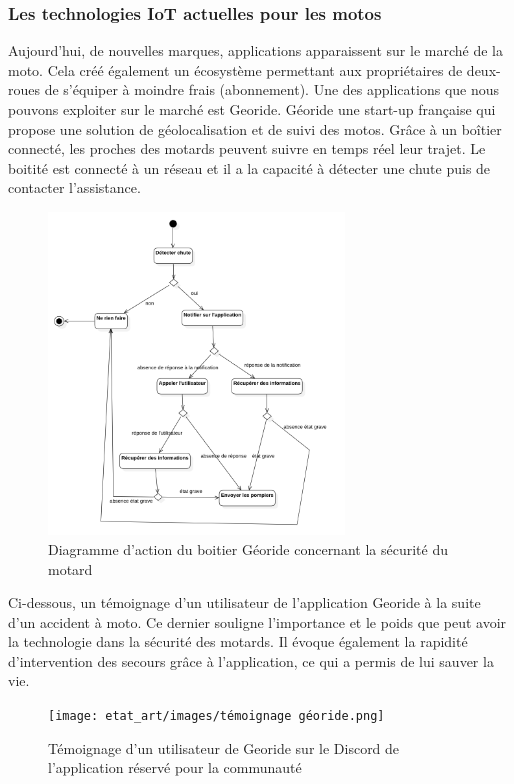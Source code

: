 \subsubsection{Les technologies IoT actuelles pour les motos}
Aujourd'hui, de nouvelles marques, applications\cite{iot_accessoire_moto} apparaissent sur le marché de la moto. Cela créé également un écosystème permettant aux propriétaires de deux-roues de s'équiper à moindre frais (abonnement). Une des applications que nous pouvons exploiter sur le marché est Georide. Géoride une start-up française qui propose une solution de géolocalisation et de suivi des motos. Grâce à un boîtier connecté, les proches des motards peuvent suivre en temps réel leur trajet. Le boitité est connecté à un réseau et il a la capacité à détecter une chute puis de contacter l'assistance. 
\begin{figure}[H]
    \centering
    \includegraphics[width=0.7\textwidth]{images/diag_etat_georide.png} 
    \caption{Diagramme d'action du boitier Géoride concernant la sécurité du motard}
\end{figure}
Ci-dessous, un témoignage d'un utilisateur de l'application Georide à la suite d'un accident à moto. Ce dernier souligne l'importance et le poids que peut avoir la technologie dans la sécurité des motards. Il évoque également la rapidité d'intervention des secours grâce à l'application, ce qui a permis de lui sauver la vie.
\begin{figure}[H]
    \centering
    \texttt{[image: etat\_art/images/témoignage géoride.png]} 
    \caption{Témoignage d'un utilisateur de Georide sur le Discord de l'application réservé pour la communauté}
\end{figure}
